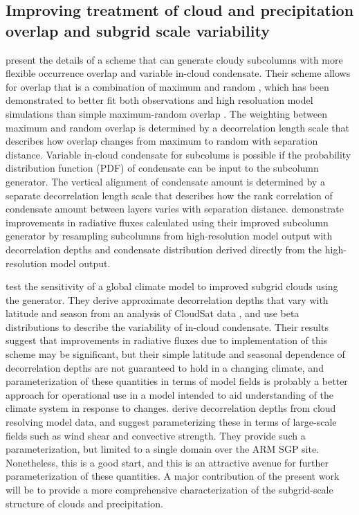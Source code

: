 \documentclass[letter]{article}
\begin{document}
\subsection{Improving treatment of cloud and precipitation overlap and subgrid scale variability}
\cite{raisanen_et_al_2004} present the details of a scheme that can generate cloudy subcolumns with more flexible occurrence overlap and variable in-cloud condensate. Their scheme allows for overlap that is a combination of maximum and random \citep[e.g.][]{hogan_and_illingworth_2000}, which has been demonstrated to better fit both observations and high resoluation model simulations than simple maximum-random overlap \citep{hogan_and_illingworth_2000,mace_and_benson-troth_2002,pincus_et_al_2005,barker_2008}. The weighting between maximum and random overlap is determined by a decorrelation length scale that describes how overlap changes from maximum to random with separation distance. Variable in-cloud condensate for subcolums is possible if the probability distribution function (PDF) of condensate can be input to the subcolumn generator. The vertical alignment of condensate amount is determined by a separate decorrelation length scale that describes how the rank correlation of condensate amount between layers varies with separation distance. \cite{raisanen_et_al_2004} demonstrate improvements in radiative fluxes calculated using their improved subcolumn generator by resampling subcolumns from high-resolution model output with decorrelation depths and condensate distribution derived directly from the high-resolution model output.

\cite{oreopoulos_et_al_2012} test the sensitivity of a global climate model to improved subgrid clouds using the \cite{raisanen_et_al_2004} generator. They derive approximate decorrelation depths that vary with latitude and season from an analysis of CloudSat data \citep{stephens_et_al_2002}, and use beta distributions to describe the variability of in-cloud condensate. Their results suggest that improvements in radiative fluxes due to implementation of this scheme may be significant, but their simple latitude and seasonal dependence of decorrelation depths are not guaranteed to hold in a changing climate, and parameterization of these quantities in terms of model fields is probably a better approach for operational use in a model intended to aid understanding of the climate system in response to changes. \cite{pincus_et_al_2005} derive decorrelation depths from cloud resolving model data, and suggest parameterizing these in terms of large-scale fields such as wind shear and convective strength. They provide such a parameterization, but limited to a single domain over the ARM SGP site. Nonetheless, this is a good start, and this is an attractive avenue for further parameterization of these quantities. A major contribution of the present work will be to provide a more comprehensive characterization of the subgrid-scale structure of clouds and precipitation.
\end{document}
